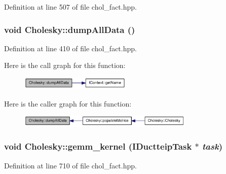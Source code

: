 Definition at line 507 of file chol\_\-fact.hpp.\hypertarget{class_cholesky_a91ddf85d95bbf73cb8e2cdb1ddfa7d4c}{
\subsubsection[{dumpAllData}]{\setlength{\rightskip}{0pt plus 5cm}void Cholesky::dumpAllData ()}}
\label{class_cholesky_a91ddf85d95bbf73cb8e2cdb1ddfa7d4c}


Definition at line 410 of file chol\_\-fact.hpp.

Here is the call graph for this function:\nopagebreak
\begin{figure}[H]
\begin{center}
\leavevmode
\includegraphics[width=150pt]{class_cholesky_a91ddf85d95bbf73cb8e2cdb1ddfa7d4c_cgraph}
\end{center}
\end{figure}


Here is the caller graph for this function:\nopagebreak
\begin{figure}[H]
\begin{center}
\leavevmode
\includegraphics[width=238pt]{class_cholesky_a91ddf85d95bbf73cb8e2cdb1ddfa7d4c_icgraph}
\end{center}
\end{figure}
\hypertarget{class_cholesky_a8891a656d18c8e11e8e26447cebc9348}{
\subsubsection[{gemm\_\-kernel}]{\setlength{\rightskip}{0pt plus 5cm}void Cholesky::gemm\_\-kernel ({\bf IDuctteipTask} $\ast$ {\em task})}}
\label{class_cholesky_a8891a656d18c8e11e8e26447cebc9348}


Definition at line 710 of file chol\_\-fact.hpp.

